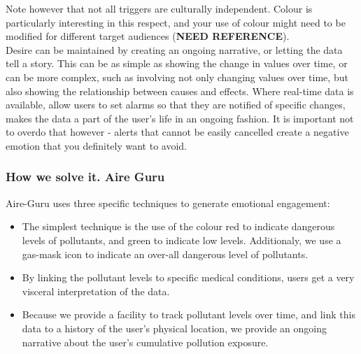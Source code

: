 Note however that not all triggers are culturally independent. Colour is particularly interesting in this respect, and your use of colour might
need to be modified for different target audiences (\textbf{NEED REFERENCE}). \\

Desire can be maintained by creating an ongoing narrative, or letting the data tell a story. This can be as simple as showing the change in 
values over time, or can be more complex, such as involving not only changing values over time, but also showing the relationship between causes and
effects. Where real-time data is available, allow users to set alarms so that they are notified of specific changes, makes the data a part of the user's
life in an ongoing fashion. It is important not to overdo that however - alerts that cannot be easily cancelled create a negative emotion that you
definitely want to avoid. \\

\subsubsection*{How we solve it. Aire Guru}

Aire-Guru uses three specific techniques to generate emotional engagement:

\begin{itemize}

    \item The simplest technique is the use of the colour red to indicate dangerous levels of pollutants, and green to indicate low levels.
    Additionaly, we use a gas-mask icon to indicate an over-all dangerous level of pollutants.

    \item By linking the pollutant levels to specific medical conditions, users get a very visceral interpretation of the data.
    
    \item Because we provide a facility to track pollutant levels over time, and link this data to a history of the user's physical location, we provide
    an ongoing narrative about the user's cumulative pollution exposure.

\end{itemize}


\begin{itemize}
    \done
    \crossed
\end{itemize}